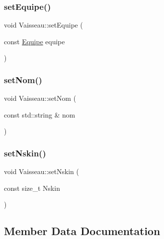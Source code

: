 \subsubsection{\texorpdfstring{set\+Equipe()}{setEquipe()}}
{\footnotesize\ttfamily void Vaisseau\+::set\+Equipe (\begin{DoxyParamCaption}\item[{const \mbox{\hyperlink{constantes_8h_a08fa5554288d5031a8f3bb83cc04ee83}{Equipe}}}]{equipe }\end{DoxyParamCaption})\hspace{0.3cm}{\ttfamily [inline]}}

\mbox{\label{class_vaisseau_a2dbe73bcc7b94642ad0eff30413842d7}} 
\subsubsection{\texorpdfstring{set\+Nom()}{setNom()}}
{\footnotesize\ttfamily void Vaisseau\+::set\+Nom (\begin{DoxyParamCaption}\item[{const std\+::string \&}]{nom }\end{DoxyParamCaption})\hspace{0.3cm}{\ttfamily [inline]}}

\mbox{\label{class_vaisseau_a0c680cba0243fac2ecda59bd2fc1f1fd}} 
\subsubsection{\texorpdfstring{set\+Nskin()}{setNskin()}}
{\footnotesize\ttfamily void Vaisseau\+::set\+Nskin (\begin{DoxyParamCaption}\item[{const size\+\_\+t}]{Nskin }\end{DoxyParamCaption})\hspace{0.3cm}{\ttfamily [inline]}}



\subsection{Member Data Documentation}
\mbox{\label{class_vaisseau_adcb02cf574b4484c2a9f2d0acd648395}} 
